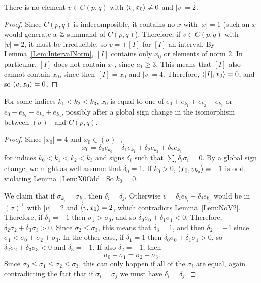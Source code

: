 \begin{lemma}\label{Lem:NoV2}
There is no element $v\in C(p,q)$ with $\left\langle v , x_0 \right\rangle \neq 0$ and $|v| = 2$. 
\end{lemma}
\begin{proof}
Since $C(p,q)$ is indecomposible, it contains no $x$ with $|x| = 1$ (such an $x$ would generate a $\mathbb{Z}$-summand of $C(p,q)$). Therefore, if $v \in C(p,q)$ with $|v| = 2$, it must be irreducible, so $v = \pm[I]$ for $[I]$ an interval. By Lemma~\ref{Lem:IntervalNorm}, $[I]$ contains only $x_0$ or elements of norm $2$. In particular, $[I]$ does not contain $x_1$, since $a_1 \ge 3$. This means that $[I]$ also cannot contain $x_0$, since then $[I] = x_0$ and $|v| = 4$. Therefore, $\left\langle [I] , x_0 \right\rangle = 0$, and so $\left\langle v , x_0 \right\rangle = 0$. 
\end{proof}

\begin{prop}\label{x0}
For some indices $k_1 < k_2 < k_3$, $x_0$ is equal to one of ${e_0 + e_{k_1} + e_{k_2} - e_{k_3}}$ or ${e_0 - e_{k_1} - e_{k_2} + e_{k_3}}$, possibly after a global sign change in the isomorphism between $(\sigma)^\perp$ and $C(p,q)$. 
\end{prop}
\begin{proof}
Since $|x_0| = 4$ and $x_0 \in (\sigma)^\perp$,
\begin{equation*}
x_0 = \delta_0 e_{k_0} + \delta_1 e_{k_1} + \delta_2 e_{k_2} + \delta_2 e_{k_3}
\end{equation*}
for indices $k_0 < k_1 < k_2 < k_3$ and signs $\delta_i$ such that $\sum_i \delta_i \sigma_i = 0$. By a global sign change, we might as well assume that $\delta_0 = 1$. If $k_0 > 0$, $\left\langle x_0 , v_{k_0} \right\rangle = -1$ is odd, violating Lemma~\ref{Lem:X0Odd}. So $k_0 = 0$.

We claim that if $\sigma_{k_i} = \sigma_{k_j}$, then $\delta_i = \delta_j$. Otherwise $v = \delta_i e_{k_i} + \delta_j e_{k_j}$ would be in $(\sigma)^\perp$ with $|v| = 2$ and $\left\langle v , x_0 \right\rangle = 2$, which contradicts Lemma~\ref{Lem:NoV2}. Therefore, if $\delta_1 = -1$ then $\sigma_1 > \sigma_0$, and so $\delta_0 \sigma_0 + \delta_1 \sigma_1 < 0$. Therefore, $\delta_2 \sigma_2 + \delta_3 \sigma_3 > 0$. Since $\sigma_2 \le \sigma_3$, this means that $\delta_3 = 1$, and then $\delta_2 = -1$ since $\sigma_1 < \sigma_0 + \sigma_2 + \sigma_3$. In the other case, if $\delta_1 = 1$ then $\delta_0 \sigma_0 + \delta_1 \sigma_1 > 0$, so $\delta_2 \sigma_2 + \delta_3 \sigma_3 < 0$ and $\delta_3 = -1$. If also $\delta_2 = -1$, then
\begin{equation*}
\sigma_0 + \sigma_1 = \sigma_2 + \sigma_3.
\end{equation*}
Since $\sigma_0 \le \sigma_1 \le \sigma_2 \le \sigma_3$, this can only happen if all of the $\sigma_i$ are equal, again contradicting the fact that if $\sigma_i = \sigma_j$ we must have $\delta_i = \delta_j$.
\end{proof}

